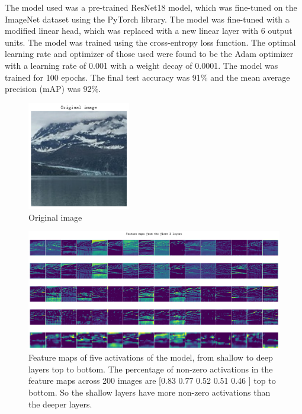 \documentclass{article}[9pt]
\begin{document}
The model used was a pre-trained ResNet18 model, which was fine-tuned on the ImageNet dataset
using the PyTorch library. The model was fine-tuned with a modified linear head, which was
replaced with a new linear layer with 6 output units. The model was trained using the cross-entropy
loss function. The optimal learning rate and optimizer of those
used were found to be the Adam optimizer with a learning rate of 0.001 with a weight decay of 0.0001.
The model was trained for
100 epochs. The final test accuracy was 91\% and the mean average precision (mAP) was 92\%. 

\clearpage

\begin{figure}[!t]
    \centering
    \includegraphics[width=0.4\textwidth]{original-image.png}
    \caption{Original image}
    \label{fig:original-image}
\end{figure}
\begin{figure}[h]
    \centering
    \includegraphics[width=1.0\textwidth]{featuremaps.png}
    \caption{Feature maps of five activations of the model, from 
        shallow to deep layers top to bottom. The percentage of non-zero activations in the 
        feature maps across 200 images are
        [0.83 0.77  0.52  0.51  0.46 ] top to bottom. So the shallow layers have more non-zero activations
        than the deeper layers.}
    \label{fig:featuremaps}
\end{figure}
\end{document}

